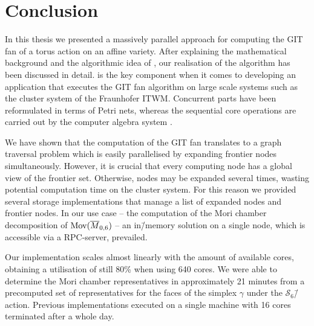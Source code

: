 \chapter{Conclusion}

In this thesis we presented a massively parallel approach for computing the GIT fan of a torus action on an affine variety. After explaining the mathematical background and the algorithmic idea of \citeauthor{gitfan_symmetry}, our realisation of the algorithm has been discussed in detail. \gpispace{} is the key component when it comes to developing an application that executes the GIT fan algorithm on large scale systems such as the cluster system of the \ac{Fraunhofer ITWM}. Concurrent parts have been reformulated in terms of Petri nets, whereas the sequential core operations are carried out by the computer algebra system \singular{}.

We have shown that the computation of the GIT fan translates to a graph traversal problem which is easily parallelised by expanding frontier nodes simultaneously. However, it is crucial that every computing node has a global view of the frontier set. Otherwise, nodes may be expanded several times, wasting potential computation time on the cluster system. For this reason we provided several storage implementations that manage a list of expanded nodes and frontier nodes. In our use case -- the computation of the Mori chamber decomposition of $\text{Mov}(\overline{M}_{0,6})$ -- an in\=/memory solution on a single node, which is accessible via a RPC-server,  prevailed.

Our implementation scales almost linearly with the amount of available cores, obtaining a utilisation of still 80\% when using 640 cores. We were able to determine the Mori chamber representatives in approximately 21 minutes from a precomputed set of representatives for the faces of the simplex $\gamma$ under the $\mathcal{S}_6$\=/action. Previous implementations executed on a single machine with 16 cores terminated after a whole day. \cite[Rermark 6.8]{gitfan_symmetry}

